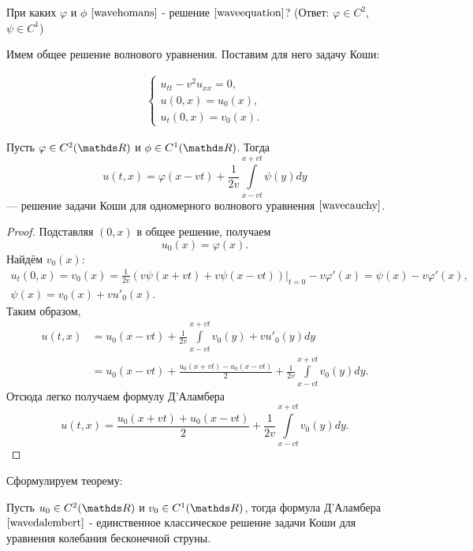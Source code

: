 \begin{exercise}
При каких $\varphi$ и $\phi$ $\eqref{wavehomans}$ - решение $\eqref{waveequation}$? (Ответ: $\varphi \in C^2$, $\psi \in C^1$)
\end{exercise}

Имем общее решение волнового уравнения. Поставим для него задачу Коши:

\begin{align}
    \begin{cases} 
        u_{tt} - v^2 u_{xx} = 0, \\
        u (0, x) = u_0 (x), \\
        u_t(0,x) = v_0 (x).
    \end{cases}
\label{wavecauchy}
\end{align}

\begin{theorem} Пусть $\varphi \in C^2(\real)$ и $\phi \in C^1(\real)$. Тогда
$$ u(t, x) = \varphi (x - vt) + \frac {1} {2v} \int \limits_{x - vt}^{x+vt} \psi (y) dy$$
--- решение задачи Коши для одномерного волнового уравнения $\ref{wavecauchy}$.
\end{theorem}
\begin{proof}
Подставляя $(0,x)$ в общее решение, получаем $$ u_0(x) = \varphi(x) .$$ Найдём $v_0(x)$:
\begin{gather*}
	u_t(0,x) = v_0(x) = \frac {1} {2v} (v \psi (x + vt) + v \psi (x - vt)) \Bigg\rvert_{t = 0} - v \varphi' (x)
	= \psi(x) - v \varphi'(x), \\
	\psi(x) = v_0(x) + v u'_0(x).
\end{gather*}
Таким образом,
\begin{align*}
	u(t,x) &= u_0(x-vt) + \frac {1} {2v} \int \limits_{x-vt}^{x+vt} v_0(y) + vu'_0(y)dy \\
	&= u_0(x-vt) + \frac {u_0(x+vt) - u_0(x-vt)} { 2} + \frac {1} {2v} \int \limits_{x-vt}^{x+vt} v_0(y)dy.
\end{align*}
Отсюда легко получаем формулу Д'Аламбера
\begin{equation}
	u(t,x) = \frac {u_0(x+vt) + u_0(x-vt)} { 2} + \frac {1} {2v} \int \limits_{x-vt}^{x+vt} v_0(y)dy.
\label{wavedalembert}
\end{equation}
\end{proof}

Сформулируем теорему:
\begin{theorem} Пусть $u_0 \in C^2(\real)$ и $v_0 \in C^1(\real)$, тогда формула Д'Аламбера $\eqref{wavedalembert}$ - единственное классическое решение задачи Коши для уравнения колебания бесконечной струны.
\end{theorem}


